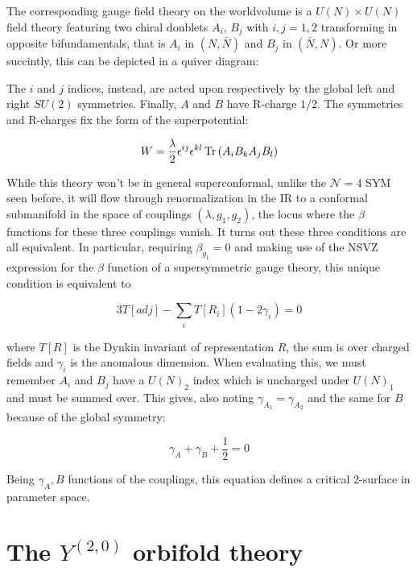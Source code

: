 The corresponding gauge field theory on the worldvolume is a $U(N)\times U(N)$ field theory featuring two chiral doublets $A_i$, $B_j$ with $i,j = 1,2$ transforming in opposite bifundamentals, that is $A_i$ in $(N,\bar N)$ and $B_j$ in $(\bar N, N)$. Or more succintly, this can be depicted in a quiver diagram:


The $i$ and $j$ indices, instead, are acted upon respectively by the global left and right $SU(2)$ symmetries. Finally, $A$ and $B$ have R-charge $1/2$. The symmetries and R-charges fix the form of the superpotential:

\begin{equation}
	W = \frac{\lambda}{2} \epsilon^{ij} \epsilon^{kl} \operatorname{Tr} \left( A_i B_k A_j B_l \right)
	\label{}
\end{equation}

While this theory won't be in general superconformal, unlike the $\mathcal{N}=4$ SYM seen before, it will flow through renormalization in the IR to a conformal submanifold in the space of couplings $(\lambda,g_1,g_2)$, the locus where the $\beta$ functions for these three couplings vanish. It turns out these three conditions are all equivalent. In particular, requiring $\beta_{g_1} = 0$ and making use of the NSVZ expression for the $\beta$ function of a supersymmetric gauge theory, this unique condition is equivalent to


\begin{equation}
	3 T[adj] - \sum_i T[R_i] ( 1- 2\gamma_i) = 0
	\label{}
\end{equation}

where $T[R]$ is the Dynkin invariant of representation $R$, the sum is over charged fields and $\gamma_i$ is the anomalous dimension. When evaluating this, we must remember $A_i$ and $B_j$ have a $U(N)_2$ index which is uncharged under $U(N)_1$ and must be summed over. This gives, also noting $\gamma_{A_1} = \gamma_{A_2}$ and the same for $B$ because of the global symmetry:

\begin{equation}
	\gamma_A + \gamma_B + \frac{1}{2} = 0
	\label{}
\end{equation}

Being $\gamma_A,B$ functions of the couplings, this equation defines a critical 2-surface in parameter space.

\section{The $Y^{(2,0)}$ orbifold theory}

